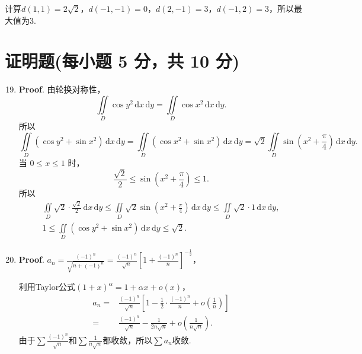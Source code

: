 \documentclass[../main.tex]{subfiles}
\begin{document}
\begin{enumerate}
          计算$d(1,1)=2\sqrt{2}$，$d(-1,-1)=0$，$d(2,-1)=3$，$d(-1,2)=3$，所以最大值为$3$.

\end{enumerate}

\section{证明题(每小题 5 分，共 10 分)}
\begin{enumerate}
    \setcounter{enumi}{18}
    \item \textbf{Proof}. 由轮换对称性，
          \[
              \iint\limits_D \cos y^2\,\mathrm{d}x\,\mathrm{d}y=\iint\limits_D \cos x^2\,\mathrm{d}x\,\mathrm{d}y.
          \]
          所以
          \[
              \iint\limits_D(\cos y^2+\sin x^2)\,\mathrm{d}x\,\mathrm{d}y
              =\iint\limits_D(\cos x^2+\sin x^2)\,\mathrm{d}x\,\mathrm{d}y=\sqrt{2}\iint\limits_{D}\sin\left(x^2+\frac{\pi}{4}\right)\,\mathrm{d}x\,\mathrm{d}y.
          \]
          当 \(0\le x\le 1\) 时，
          \[
              \frac{\sqrt2}{2}\le \sin\left(x^2+\frac{\pi}{4}\right)\le 1.
          \]
          所以
          \[
              \begin{gathered}
                  \iint\limits_{D}\sqrt{2}\cdot\frac{\sqrt{2}}{2}\,\mathrm{d}x\,\mathrm{d}y\le \iint\limits_{D}\sqrt{2}\sin\left(x^2+\frac{\pi}{4}\right)\,\mathrm{d}x\,\mathrm{d}y\le \iint\limits_{D}\sqrt{2}\cdot 1\,\mathrm{d}x\,\mathrm{d}y,\\
                  1\le \iint\limits_{D}(\cos y^2+\sin x^2)\,\mathrm{d}x\,\mathrm{d}y\le \sqrt{2}.
              \end{gathered}
          \]

    \item \textbf{Proof}. $a_n=\frac{(-1)^n}{\sqrt{n+(-1)^n}}=\frac{(-1)^n}{\sqrt{n}}\left[1+\frac{(-1)^n}{n}\right]^{-\frac{1}{2}}$，

          利用Taylor公式$(1+x)^{\alpha}=1+\alpha x+o(x)$，
          \[
              \begin{aligned}
                  a_n= {} & \frac{(-1)^n}{\sqrt{n}}\left[1-\frac{1}{2}\cdot\frac{(-1)^n}{n}+o\left(\frac{1}{n}\right)\right] \\
                  = {}    & \frac{(-1)^n}{\sqrt{n}}-\frac{1}{2n\sqrt{n}}+o\left(\frac{1}{n\sqrt{n}}\right).
              \end{aligned}
          \]
          由于$\sum \frac{(-1)^n}{\sqrt{n}}$和$\sum \frac{1}{n\sqrt{n}}$都收敛，所以$\sum a_n$收敛.

\end{enumerate}
\end{document}

